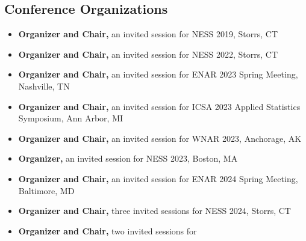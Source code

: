 \documentclass[12pt,letterpaper]{article}
\newenvironment{cventry}{\begin{minipage}[t]{\linewidth}}{\end{minipage}}
\begin{document}
	\subsection*{Conference Organizations}
	\begin{itemize}
		\item\begin{cventry} {\bf Organizer and Chair,} an invited session for NESS 
		2019, Storrs, CT
		\par\end{cventry}
		\item\begin{cventry} {\bf Organizer and Chair,} an invited session for NESS 
		2022, Storrs, CT
		\par\end{cventry}
		\item\begin{cventry} {\bf Organizer and Chair,} an invited session for ENAR 
		2023 Spring Meeting, Nashville, TN
		\par\end{cventry}
		\item\begin{cventry} {\bf Organizer and Chair,} an invited session for ICSA 
		2023 Applied Statistics Symposium, Ann Arbor, MI
		\par\end{cventry}
		\item\begin{cventry} {\bf Organizer and Chair,} an invited session for WNAR 
		2023, Anchorage, AK
		\par\end{cventry}
		\item\begin{cventry} {\bf Organizer,} an invited session for NESS 2023, 
		Boston, MA
		\par\end{cventry}
		\item\begin{cventry} {\bf Organizer and Chair,} an invited session for ENAR 
		2024 Spring Meeting, Baltimore, MD
		\par\end{cventry}
		\item\begin{cventry} {\bf Organizer and Chair,} three invited sessions for 
		NESS 2024, Storrs, CT
		\par\end{cventry}
		\item\begin{cventry} {\bf Organizer and Chair,} two invited sessions for 

\end{cventry}
\end{itemize}
\end{document}
